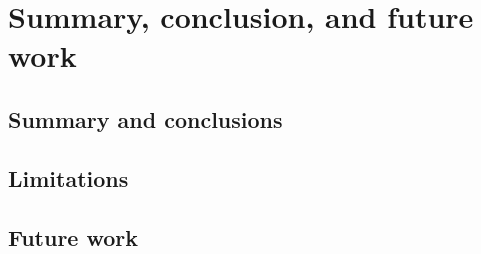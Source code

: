 \chapter{Summary, conclusion, and future work}
\section{Summary and conclusions}
\section{Limitations}
\section{Future work}
